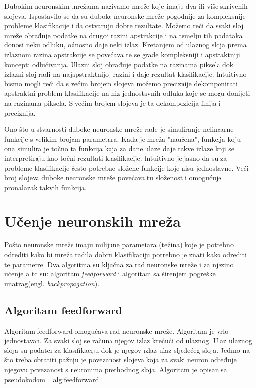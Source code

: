 \documentclass[times, utf8, zavrsni, numeric]{fer}
\begin{document}
Dubokim neuronskim mrežama nazivamo mreže koje imaju dva ili više skrivenih slojeva. Ispostavilo se da su duboke neuronske mreže pogodnije za kompleksnije probleme klasifikacije i da ostvaruju dobre rezultate. Možemo reći da svaki sloj mreže obrađuje podatke na drugoj razini apstrakcije i na temelju tih podataka donosi neku odluku, odnosno daje neki izlaz. Kretanjem od ulaznog sloja prema izlaznom razina apstrakcije se povećava te se grade kompleksniji i apstraktniji koncepti odlučivanja. Ulazni sloj obrađuje podatke na razinama piksela dok izlazni sloj radi na najapstraktnijoj razini i daje rezultat klasifikacije. Intuitivno bismo mogli reći da s većim brojem slojeva možemo preciznije dekomponirati apstraktni problem klasifikacije na niz jednostavnih odluka koje se mogu donijeti na razinama piksela. S većim brojem slojeva je ta dekompozicija finija i preciznija.

Ono što u stvarnosti duboke neuronske mreže rade je simuliranje nelinearne funkcije s velikim brojem parametara. Kada je mreža "naučena", funkcija koju ona simulira je točno ta funkcija koja za dane ulaze daje takve izlaze koji se interpretiraju kao točni rezultati klasifikacije. Intuitivno je jasno da su za probleme klasifikacije često potrebne složene funkcije koje nisu jednostavne. Veći broj slojeva duboke neuronske mreže povećava tu složenost i omogućuje pronalazak takvih funkcija.

\section{Učenje neuronskih mreža}
Pošto neuronske mreže imaju milijune parametara (težina) koje je potrebno odrediti kako bi mreža radila dobru klasifikaciju potrebno je znati kako odrediti te parametre. Dva algoritma su ključna za rad neuronske mreže i za njezino učenje a to su: algoritam \textit{feedforward} i algoritam sa širenjem pogreške unatrag(engl. \textit{backpropagation}).

\subsection{Algoritam feedforward}
Algoritam feedforward omogućava rad neuronske mreže. Algoritam je vrlo jednostavan. Za svaki sloj se  računa njegov izlaz krećući od ulaznog. Ulaz ulaznog sloja su podatci za klasifikaciju dok je njegov izlaz ulaz sljedećeg sloja. Jedino na što treba obratiti pažnju je povezanost slojeva koja za svaki neuron određuje njegovu povezanost s neuronima prethodnog sloja. Algoritam je opisan sa pseudokodom ~\ref{alg:feedforward}.
\end{document}
